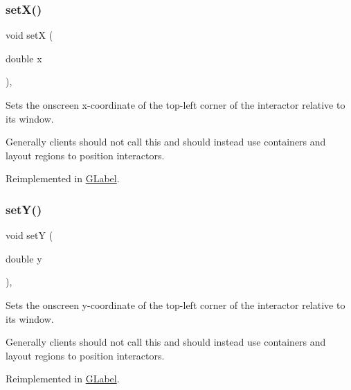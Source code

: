 \subsubsection{\texorpdfstring{set\+X()}{setX()}}
{\footnotesize\ttfamily void setX (\begin{DoxyParamCaption}\item[{double}]{x }\end{DoxyParamCaption})\hspace{0.3cm}{\ttfamily [virtual]}, {\ttfamily [inherited]}}



Sets the onscreen x-\/coordinate of the top-\/left corner of the interactor relative to its window. 

Generally clients should not call this and should instead use containers and layout regions to position interactors. 

Reimplemented in \mbox{\hyperlink{classsgl_1_1GLabel_a173837ba805eaa2411e88834869d3a9c}{G\+Label}}.

\mbox{\label{classsgl_1_1GInteractor_a7d57e2a5c35d27feb58fd498a3cf82b9}} 
\subsubsection{\texorpdfstring{set\+Y()}{setY()}}
{\footnotesize\ttfamily void setY (\begin{DoxyParamCaption}\item[{double}]{y }\end{DoxyParamCaption})\hspace{0.3cm}{\ttfamily [virtual]}, {\ttfamily [inherited]}}



Sets the onscreen y-\/coordinate of the top-\/left corner of the interactor relative to its window. 

Generally clients should not call this and should instead use containers and layout regions to position interactors. 

Reimplemented in \mbox{\hyperlink{classsgl_1_1GLabel_a0b738606c7aca5c472b66c4e55b3c685}{G\+Label}}.

\mbox{\label{classsgl_1_1GRadioButton_ad277193b2dca0bab1e0ad24d45407dc3}} 
